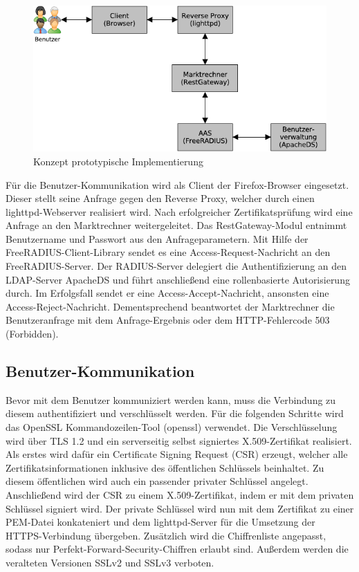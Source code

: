\documentclass[11pt,a4paper]{report}
\begin{document}
\begin{figure}[htbp]
\centering
\includegraphics[scale=1]{images/design_architekture.pdf}
\caption{Konzept prototypische Implementierung}
\label{fig:konzept_proto_impl}
\end{figure}

Für die Benutzer-Kommunikation wird als Client der Firefox-Browser eingesetzt. Dieser stellt seine Anfrage gegen den Reverse Proxy, welcher durch einen lighttpd-Webserver realisiert wird. Nach erfolgreicher Zertifikatsprüfung wird eine Anfrage an den Marktrechner weitergeleitet. Das RestGateway-Modul entnimmt Benutzername und Passwort aus den Anfrageparametern. Mit Hilfe der FreeRADIUS-Client-Library sendet es eine Access-Request-Nachricht an den FreeRADIUS-Server. Der RADIUS-Server delegiert die Authentifizierung an den LDAP-Server ApacheDS und führt anschließend eine rollenbasierte Autorisierung durch. Im Erfolgsfall sendet er eine Access-Accept-Nachricht, ansonsten eine Access-Reject-Nachricht. Dementsprechend beantwortet der Marktrechner die Benutzeranfrage mit dem Anfrage-Ergebnis oder dem HTTP-Fehlercode 503 (Forbidden).

\subsection{Benutzer-Kommunikation}

Bevor mit dem Benutzer kommuniziert werden kann, muss die Verbindung zu diesem authentifiziert und verschlüsselt werden. Für die folgenden Schritte wird das OpenSSL Kommandozeilen-Tool (openssl) verwendet. Die Verschlüsselung wird über TLS 1.2 und ein serverseitig selbst signiertes X.509-Zertifikat realisiert. Als erstes wird dafür ein Certificate Signing Request (CSR) erzeugt, welcher alle Zertifikatsinformationen inklusive des öffentlichen Schlüssels beinhaltet. Zu diesem öffentlichen wird auch ein passender privater Schlüssel angelegt. Anschließend wird der CSR zu einem X.509-Zertifikat, indem er mit dem privaten Schlüssel signiert wird. Der private Schlüssel wird nun mit dem Zertifikat zu einer PEM-Datei konkateniert und dem lighttpd-Server für die Umsetzung der HTTPS-Verbindung übergeben. Zusätzlich wird die Chiffrenliste angepasst, sodass nur Perfekt-Forward-Security-Chiffren erlaubt sind. Außerdem werden die veralteten Versionen SSLv2 und SSLv3 verboten.
\end{document}
